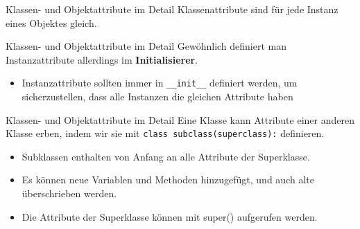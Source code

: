 \begin{frame}[fragile]{Klassen- und Objektattribute im Detail}
	Klassenattribute sind für jede Instanz eines Objektes gleich.
	
\end{frame}

\begin{frame}[fragile]{Klassen- und Objektattribute im Detail}
	Gewöhnlich definiert man Instanzattribute allerdings im \textbf{Initialisierer}.
	 
	\begin{itemize}
		\item Instanzattribute sollten immer in \alert{\texttt{\_\_init\_\_}} definiert werden, um sicherzustellen, dass alle Instanzen die gleichen Attribute haben
	\end{itemize}
\end{frame}

\begin{frame}[fragile]{Klassen- und Objektattribute im Detail}
	Eine Klasse kann Attribute einer anderen Klasse erben, indem wir sie mit  \alert{\texttt{class subclass(superclass):}} definieren.
	\begin{itemize}
		\item Subklassen enthalten von Anfang an alle Attribute der Superklasse.
		\item Es können neue Variablen und Methoden hinzugefügt, und auch alte überschrieben werden.
		\item Die Attribute der Superklasse können mit \alert{super()} aufgerufen werden.
	\end{itemize}
\end{frame}


